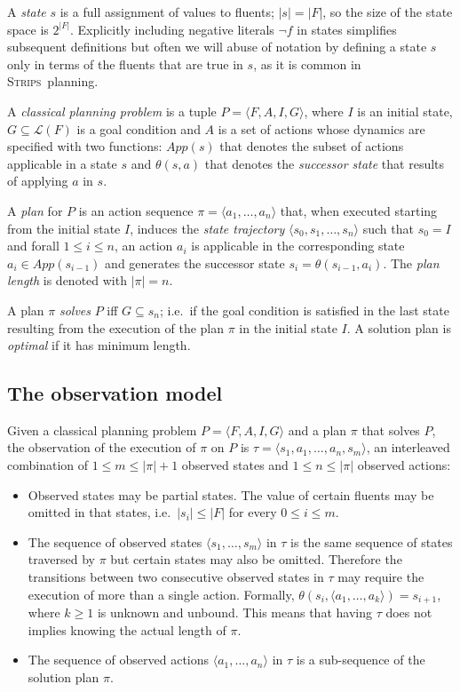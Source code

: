 \documentclass[letterpaper]{article} %
\newcommand{\tup}[1]{{\langle #1 \rangle}}
\newcommand{\strips}{\textsc{Strips}}     %
\begin{document}
A {\em state} $s$ is a full assignment of values to fluents; $|s|=|F|$, so the size of the state space is $2^{|F|}$. Explicitly including negative literals $\neg f$ in states simplifies subsequent definitions but often we will abuse of notation by defining a state $s$ only in terms of the fluents that are true in $s$, as it is common in \strips\ planning.

A {\em classical planning problem} is a tuple $P=\tup{F,A,I,G}$, where $I$ is an initial state, $G\subseteq\mathcal{L}(F)$ is a goal condition and $A$ is a set of actions whose dynamics are specified with two functions: $App(s)$ that denotes the subset of actions applicable in a state $s$ and $\theta(s,a)$ that denotes the {\em successor state} that results of applying $a$ in $s$.

A {\em plan} for $P$ is an action sequence $\pi=\tup{a_1, \ldots, a_n}$ that, when executed starting from the initial state $I$, induces the {\em state trajectory} $\tup{s_0, s_1, \ldots, s_n}$ such that $s_0=I$ and forall {\small $1\leq i\leq n$}, an action $a_i$ is applicable in the corresponding state $a_i\in App(s_{i-1})$ and  generates the successor state $s_i=\theta(s_{i-1},a_i)$. The {\em plan length} is denoted with $|\pi|=n$.

A plan $\pi$ {\em solves} $P$ iff $G\subseteq s_n$; i.e.~if the goal condition is satisfied in the last state resulting from the execution of the plan $\pi$ in the initial state $I$. A solution plan is {\em optimal} if it has minimum length.

\subsection{The observation model}
Given a classical planning problem $P=\tup{F,A,I,G}$ and a plan $\pi$ that solves $P$, the observation of the execution of  $\pi$ on $P$ is $\tau=\tup{s_1, a_1, \ldots , a_n, s_m}$, an interleaved combination of {\small $1\leq m\leq |\pi|+1$} observed states and {\small $1\leq n\leq |\pi|$} observed actions:
\begin{itemize}
\item Observed states may be partial states. The value of certain fluents may be omitted in that states, i.e.~$|s_i|\leq |F|$ for every $0\leq i\leq m$.

\item The sequence of observed states $\tup{s_1, \ldots, s_m}$ in $\tau$ is the same sequence of states traversed by $\pi$ but certain states may also be omitted. Therefore the transitions between two consecutive observed states in $\tau$ may require the execution of more than a single action. Formally, $\theta(s_i,\tup{a_1,\ldots,a_k})=s_{i+1}$, where $k\geq 1$ is unknown and unbound. This means that having $\tau$ does not implies knowing the actual length of $\pi$.
\item The sequence of observed actions $\tup{a_1, \ldots, a_n}$ in $\tau$ is a sub-sequence of the solution plan $\pi$.
\end{itemize}
\end{document}
